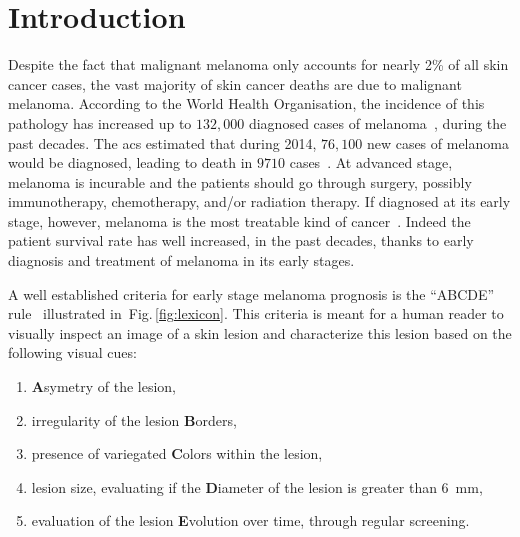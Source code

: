 \graphicspath{ {./content/intro/figures/} }

\section{Introduction}
\label{sec:descr}  %
Despite the fact that malignant melanoma only accounts for nearly 2\% of all skin cancer cases, the vast majority of skin cancer deaths are due to malignant melanoma.
According to the World Health Organisation, the incidence of this pathology has increased up to $132,000$ diagnosed cases of melanoma~\cite{WoH}, during the past decades.
The \Ac{acs} estimated that during 2014, $76,100$ new cases of melanoma would be diagnosed, leading to death in $9710$ cases~\cite{CancerFactsFigures2014}.
At advanced stage, melanoma is incurable and the patients should go through surgery, possibly immunotherapy, chemotherapy, and/or radiation therapy.
If diagnosed at its early stage, however, melanoma is the most treatable kind of cancer~\cite{CancerFactsFigures2014,forsea2012melanoma}.
Indeed the patient survival rate has well increased, in the past decades, thanks to early diagnosis and treatment of melanoma in its early stages.

A well established criteria for early stage melanoma prognosis is the ``ABCDE'' rule~\cite{abbasi2004early} illustrated in~Fig.\,\ref{fig:lexicon}.
This criteria is meant for a human reader to visually inspect an image of a skin lesion and characterize this lesion based on the following visual cues:
\begin{enumerate}[label=(\Alph*)]
\item {\textbf A}symetry of the lesion,
\item irregularity of the lesion {\textbf B}orders,
\item presence of variegated {\textbf C}olors within the lesion,
\item lesion size, evaluating if the {\textbf D}iameter of the lesion is greater than \SI{6}{\milli \meter},
\item evaluation of the lesion {\textbf E}volution over time, through regular screening.
\end{enumerate}

